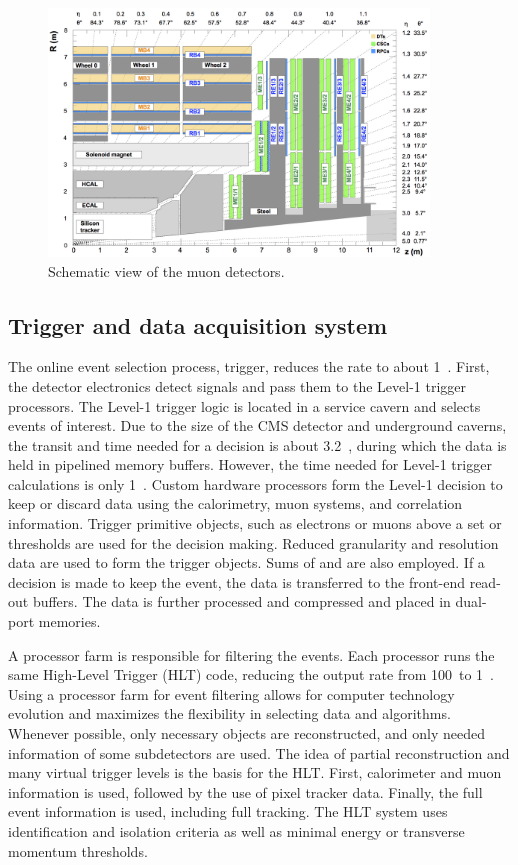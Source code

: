 \begin{figure}[htbp]
  \centering
  \includegraphics[width=0.9\textwidth]{plots/chapter3/muon.png}
  \caption{Schematic view of the muon detectors.}
  \label{fig:muon}
\end{figure}

\subsection{Trigger and data acquisition system}

The online event selection process, trigger, reduces the rate to about 1~\khz. First, the detector electronics detect signals and pass them to the Level-1 trigger processors. The Level-1 trigger logic is located in a service cavern and selects events of interest. Due to the size of the CMS detector and underground caverns, the transit and time needed for a decision is about 3.2~\mus, during which the data is held in pipelined memory buffers. However, the time needed for Level-1 trigger calculations is only 1~\mus. Custom hardware processors form the Level-1 decision to keep or discard data using the calorimetry, muon systems, and correlation information. Trigger primitive objects, such as electrons or muons above a set \ET or \pt thresholds are used for the decision making. Reduced granularity and resolution data are used to form the trigger objects. Sums of \ET and \met are also employed. If a decision is made to keep the event, the data is transferred to the front-end read-out buffers. The data is further processed and compressed and placed in dual-port memories.

A processor farm is responsible for filtering the events. Each processor runs the same High-Level Trigger (HLT) code, reducing the output rate from 100~\khz to 1~\khz. Using a processor farm for event filtering allows for computer technology evolution and maximizes the flexibility in selecting data and algorithms. Whenever possible, only necessary objects are reconstructed, and only needed information of some subdetectors are used. The idea of partial reconstruction and many virtual trigger levels is the basis for the HLT. First, calorimeter and muon information is used, followed by the use of pixel tracker data. Finally, the full event information is used, including full tracking. The HLT system uses identification and isolation criteria as well as minimal energy or transverse momentum thresholds.

